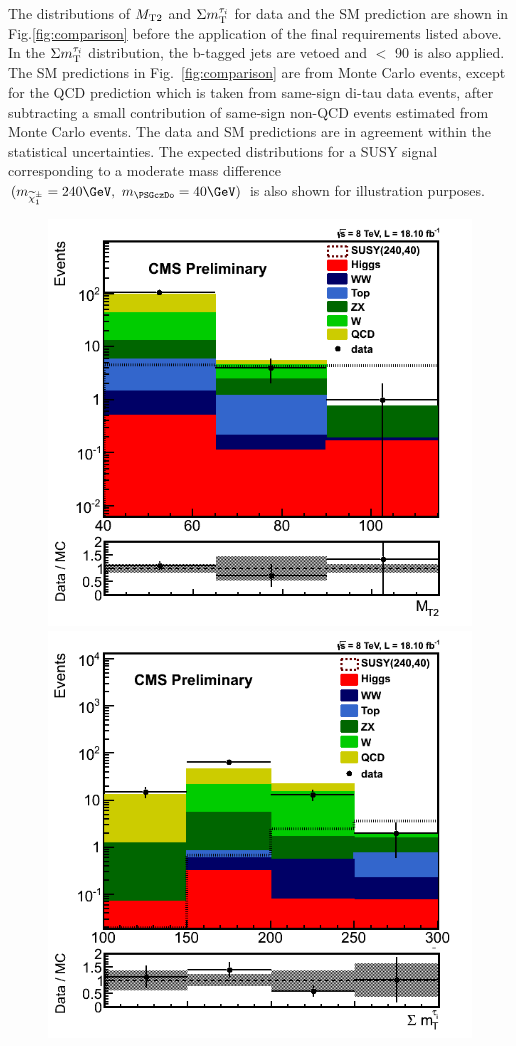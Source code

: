 The distributions of ${M_{\rm T2}}$ and $\Sigma m_{\rm T}^{\tau_i}$ for data and the SM prediction
are shown in Fig.\ref{fig:comparison} before the application of the final
requirements listed above.
In the $\Sigma m_{\rm T}^{\tau_i}$ distribution, the b-tagged jets are vetoed and \mttwo $<$ 90 \GeV is also applied.
The SM predictions in Fig.~\ref{fig:comparison} 
are from Monte Carlo events, except for the
QCD prediction which is taken from same-sign di-tau data events,
after subtracting a small contribution of same-sign non-QCD events estimated from Monte Carlo events.
The data and SM predictions are in agreement within the statistical uncertainties.
The expected distributions for a SUSY signal 
corresponding to a moderate mass difference $(m_{\chione}=240\GeV,~m_{\PSGczDo}=40\GeV)$
is also shown for illustration purposes.
\begin{figure}[!Hhtb]
\centering
\includegraphics[angle=0,scale=0.375]{TauTauFigs/MT2_SSQCD.png}
\includegraphics[angle=0,scale=0.375]{TauTauFigs/SumMT_SSQCD.png} \\ 

\end{figure}

